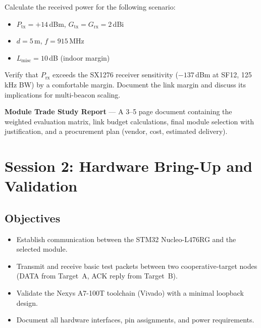 \documentclass[11pt,letterpaper]{article}
\begin{document}
	\begin{tcolorbox}[infobox={Exercise: Link Budget Worksheet}]
		Calculate the received power for the following scenario:
		\begin{itemize}
			\item $P_{\text{tx}} = +14$\,dBm, $G_{\text{tx}} = G_{\text{rx}} = 2$\,dBi
			\item $d = 5$\,m, $f = 915$\,MHz
			\item $L_{\text{misc}} = 10$\,dB (indoor margin)
		\end{itemize}
		Verify that $P_{\text{rx}}$ exceeds the SX1276 receiver sensitivity ($-137$\,dBm at SF12, 125\,kHz BW) by a comfortable margin. Document the link margin and discuss its implications for multi-beacon scaling.
	\end{tcolorbox}
	
	\begin{tcolorbox}[deliverable={Session 1 Deliverable}]
		\textbf{\RF{} Module Trade Study Report} --- A 3--5 page document containing the weighted evaluation matrix, link budget calculations, final module selection with justification, and a procurement plan (vendor, cost, estimated delivery).
	\end{tcolorbox}
	
	\newpage
	\section{Session 2: Hardware Bring-Up and Validation}
	\label{sec:bringup}
	
	\subsection{Objectives}
	
	\begin{itemize}[leftmargin=2em]
		\item Establish \SPI{} communication between the STM32 Nucleo-L476RG and the selected \RF{} module.
		\item Transmit and receive basic test packets between two cooperative-target nodes (DATA from Target~A, ACK reply from Target~B).
		\item Validate the Nexys A7-100T \FPGA{} toolchain (Vivado) with a minimal loopback design.
		\item Document all hardware interfaces, pin assignments, and power requirements.
	\end{itemize}
	
\end{document}
